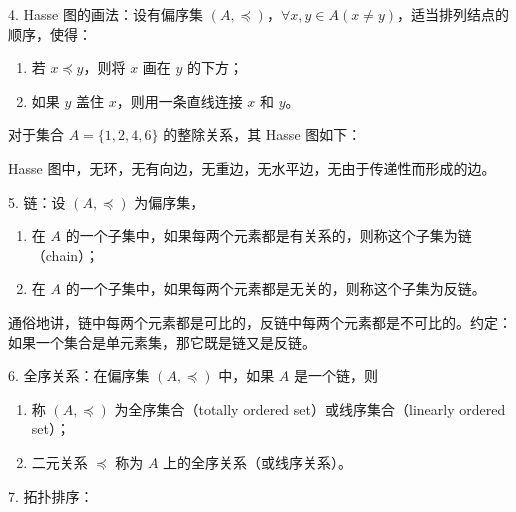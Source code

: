 \documentclass[normal,cyan]{elegantnote}
\begin{document}
4. Hasse 图的画法：设有偏序集 $(A, \preccurlyeq)$，$\forall x, y \in A(x \neq y)$，适当排列结点的顺序，使得：
\begin{enumerate}
    \item 若 $x \preccurlyeq y$，则将 $x$ 画在 $y$ 的下方；
    \item 如果 $y$ 盖住 $x$，则用一条直线连接 $x$ 和 $y$。
\end{enumerate}
对于集合 $A = \{1, 2, 4, 6\}$ 的整除关系，其 Hasse 图如下：

\begin{center}
\end{center}
\begin{note}
    Hasse 图中，无环，无有向边，无重边，无水平边，无由于传递性而形成的边。
\end{note}
5. 链：设 $(A, \preccurlyeq)$ 为偏序集，
\begin{enumerate}
    \item 在 $A$ 的一个子集中，如果每两个元素都是有关系的，则称这个子集为{\color{red}链}（chain）；
    \item 在 $A$ 的一个子集中，如果每两个元素都是无关的，则称这个子集为{\color{red}反链}。
\end{enumerate}
\begin{note}
    通俗地讲，链中每两个元素都是可比的，反链中每两个元素都是不可比的。约定：如果一个集合是单元素集，那它既是链又是反链。
\end{note}
6. 全序关系：在偏序集 $(A, \preccurlyeq)$ 中，如果 $A$ 是一个链，则
\begin{enumerate}
    \item 称 $(A, \preccurlyeq)$ 为{\color{red}全序集合}（totally ordered set）或{\color{red}线序集合}（linearly ordered set）；
    \item 二元关系 $\preccurlyeq$ 称为 $A$ 上的{\color{red}全序关系}（或{\color{red}线序关系}）。
\end{enumerate}
7. 拓扑排序：
\end{document}
